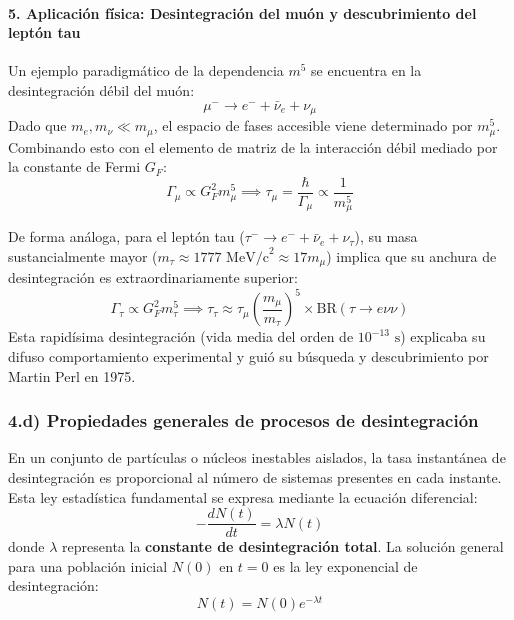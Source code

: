 \paragraph{5. Aplicación física: Desintegración del muón y descubrimiento del leptón tau}

Un ejemplo paradigmático de la dependencia $m^5$ se encuentra en la desintegración débil del muón:
\begin{equation}
\mu^- \longrightarrow e^- + \bar{\nu}_e + \nu_\mu
\end{equation}
Dado que $m_e, m_\nu \ll m_\mu$, el espacio de fases accesible viene determinado por $m_\mu^5$. Combinando esto con el elemento de matriz de la interacción débil mediado por la constante de Fermi $G_F$:
\begin{equation}
\Gamma_\mu \propto G_F^2 m_\mu^5 \implies \tau_\mu = \frac{\hbar}{\Gamma_\mu} \propto \frac{1}{m_\mu^5}
\end{equation}

De forma análoga, para el leptón tau ($\tau^- \to e^- + \bar{\nu}_e + \nu_\tau$), su masa sustancialmente mayor ($m_\tau \approx 1777\text{ MeV/c}^2 \approx 17 m_\mu$) implica que su anchura de desintegración es extraordinariamente superior:
\begin{equation}
\Gamma_\tau \propto G_F^2 m_\tau^5 \implies \tau_\tau \approx \tau_\mu \left( \frac{m_\mu}{m_\tau} \right)^5 \times \text{BR}(\tau \to e \nu \nu)
\end{equation}
Esta rapidísima desintegración (vida media del orden de $10^{-13}\text{ s}$) explicaba su difuso comportamiento experimental y guió su búsqueda y descubrimiento por Martin Perl en 1975.
\newpage

\subsubsection*{4.d) Propiedades generales de procesos de desintegración}

En un conjunto de partículas o núcleos inestables aislados, la tasa instantánea de desintegración es proporcional al número de sistemas presentes en cada instante. Esta ley estadística fundamental se expresa mediante la ecuación diferencial:
\begin{equation}
-\frac{dN(t)}{dt} = \lambda N(t)
\end{equation}
donde $\lambda$ representa la \textbf{constante de desintegración total}. La solución general para una población inicial $N(0)$ en $t = 0$ es la ley exponencial de desintegración:
\begin{equation}
N(t) = N(0) e^{-\lambda t}
\end{equation}

